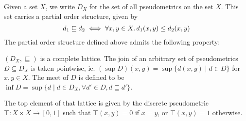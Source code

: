 Given a set $X$, we write $D_X$ for the set of all pseudometrics on the set $X$. This set carries a partial order structure, given by
\begin{gather*}d_1 \sqsubseteq d_2 \iff \forall x,y \in X \ldotp d_1(x,y) \leq d_2(x,y)\end{gather*} 
The partial order structure defined above admits the following property:
\begin{lemma}\label{c2:lem:pseudometrics_complete_lattice}
    $(D_X, \sqsubseteq )$ is a complete lattice. The join of an arbitrary set of pseudometrics $D \subseteq D_X$ is taken pointwise, ie. $\left(\sup D \right)(x,y) = \sup \{ d(x,y) \mid d \in D\}$ for $x, y \in X$. The meet of $D$ is defined to be $\inf D = \sup \{ d \mid d \in D_X , \forall {d' \in D}, d \sqsubseteq d'\}$.
\end{lemma}
The top element of that lattice is given by the discrete pseudometric $\top \colon X \times X \to [0,1]$ such that $\top(x,y) = 0$ if $x=y$, or $\top(x,y)=1$ otherwise.

